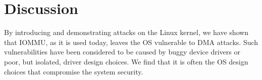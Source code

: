 

\section{Discussion}





By introducing and demonstrating \compound{} attacks on the Linux kernel, we have shown that IOMMU, as it is used today, leaves the OS vulnerable to DMA attacks. Such vulnerabilities have been considered to be caused by buggy device drivers or poor, but isolated, driver design choices. We find that it is often the OS design choices that compromise the system security.

